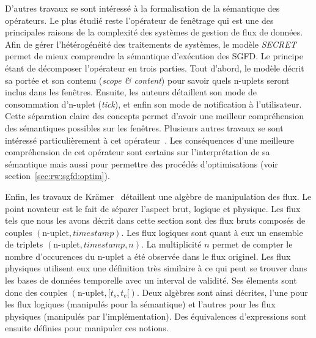 D'autres travaux se sont intéressé à la formalisation de la sémantique des opérateurs. Le plus étudié reste l'opérateur de fenêtrage qui est une des principales raisons de la complexité des systèmes de gestion de flux de données. Afin de gérer l'hétérogénéité des traitements de systèmes, le modèle \textit{SECRET} permet de mieux comprendre la sémantique d'exécution des SGFD. Le principe étant de décomposer l'opérateur en trois parties. Tout d'abord, le modèle décrit sa portée et son contenu (\textit{scope \& content}) pour savoir quels n-uplets seront inclus dans les fenêtres. Ensuite, les auteurs détaillent son mode de consommation d'n-uplet (\textit{tick}), et enfin son mode de notification à l'utilisateur. Cette séparation claire des concepts permet d'avoir une meilleur compréhension des sémantiques possibles sur les fenêtres. Plusieurs autres travaux se sont intéressé particulièrement à cet opérateur~\cite{Patroumpas:window,Patroumpas:subsumewindows,Maier:semantics}. Les conséquences d'une meilleure compréhension de cet opérateur sont certains sur l'interprétation de sa sémantique mais aussi pour permettre des procédés d'optimisations (voir section~\ref{sec:rw:sgfd:optim}).

Enfin, les travaux de Krämer~\cite{Kramer:semantics} détaillent une algèbre de manipulation des flux. Le point novateur est le fait de séparer l'aspect brut, logique et physique. Les flux tels que nous les avons décrit dans cette section sont des flux bruts composés de couples $(\textrm{n-uplet},\textit{timestamp})$. Les flux logiques sont quant à eux un ensemble de triplets $(\textrm{n-uplet}, \textit{timestamp}, n)$. La multiplicité $n$ permet de compter le nombre d'occurences du n-uplet a été observée dans le flux originel. Les flux physiques utilisent eux une définition très similaire à ce qui peut se trouver dans les bases de données temporelle avec un interval de validité. Ses élements sont donc des couples $(\textrm{n-uplet},[t_s, t_e[)$. Deux algèbres sont ainsi décrites, l'une pour les flux logiques (manipulés pour la sémantique) et l'autres pour les flux physiques (manipulés par l'implémentation). Des équivalences d'expressions sont ensuite définies pour manipuler ces notions.

